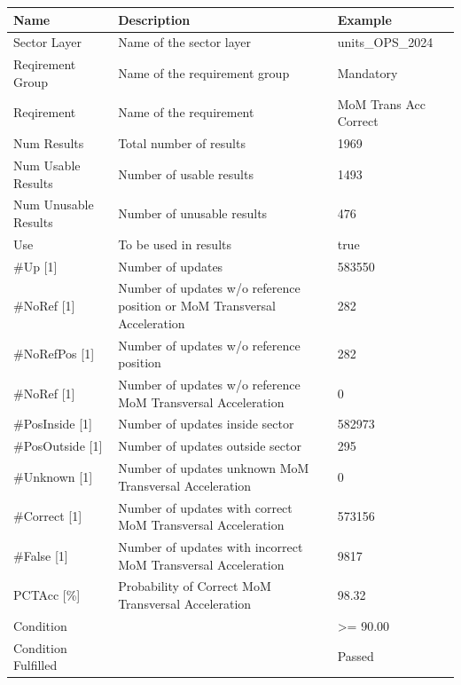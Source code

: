 \begin{center}
 \begin{table}[H]
  \begin{tabularx}{\textwidth}{ | l | X |  l | }
    \hline
    \textbf{Name} & \textbf{Description} & \textbf{Example} \\ \hline
    Sector Layer & Name of the sector layer & units\_OPS\_2024 \\ \hline
    Reqirement Group & Name of the requirement group & Mandatory \\ \hline
    Reqirement & Name of the requirement & MoM Trans Acc Correct \\ \hline
    Num Results & Total number of results & 1969 \\ \hline
    Num Usable Results & Number of usable results & 1493 \\ \hline
    Num Unusable Results & Number of unusable results & 476 \\ \hline
    Use & To be used in results & true \\ \hline
    \#Up [1] & Number of updates & 583550 \\ \hline
    \#NoRef [1] & Number of updates w/o reference position or MoM Transversal Acceleration & 282 \\ \hline
    \#NoRefPos [1] & Number of updates w/o reference position & 282 \\ \hline
    \#NoRef [1] & Number of updates w/o reference MoM Transversal Acceleration & 0 \\ \hline
    \#PosInside [1] & Number of updates inside sector & 582973 \\ \hline
    \#PosOutside [1] & Number of updates outside sector & 295 \\ \hline
    \#Unknown [1] & Number of updates unknown MoM Transversal Acceleration & 0 \\ \hline
    \#Correct [1] & Number of updates with correct MoM Transversal Acceleration & 573156 \\ \hline
    \#False [1] & Number of updates with incorrect MoM Transversal Acceleration & 9817 \\ \hline
    PCTAcc [\%] & Probability of Correct MoM Transversal Acceleration & 98.32 \\ \hline
    Condition &  & >= 90.00 \\ \hline
    Condition Fulfilled &  & Passed \\ \hline
    \end{tabularx}
\end{table}
\end{center}

